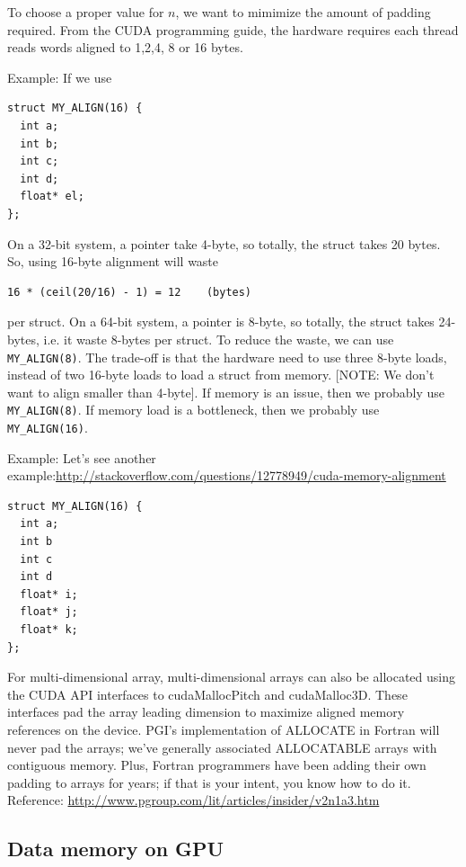 \begin{framed}
To choose a proper value for $n$, we want to mimimize the amount of padding
required. From the CUDA programming guide, the hardware requires each thread
reads words aligned to 1,2,4, 8 or 16 bytes.
\end{framed}

Example: If we use
\begin{lstlisting}
struct MY_ALIGN(16) {
  int a;
  int b;
  int c;
  int d;
  float* el;    
};
\end{lstlisting}
On a 32-bit system, a pointer take 4-byte, so totally, the struct takes 20
bytes. So, using 16-byte alignment will waste 
\begin{verbatim}
16 * (ceil(20/16) - 1) = 12    (bytes)
\end{verbatim}
per struct. On a 64-bit system, a pointer is 8-byte, so totally, the struct
takes 24-bytes, i.e. it waste 8-bytes per struct. To reduce the waste, we can
use \verb!MY_ALIGN(8)!. The trade-off is that the hardware need to use three
8-byte loads, instead of two 16-byte loads to load a struct from memory. [NOTE:
We don't want to align smaller than 4-byte]. If memory is an issue, then we
probably use \verb!MY_ALIGN(8)!. If memory load is a bottleneck, then we
probably use \verb!MY_ALIGN(16)!. 


Example: Let's see another
example:\url{http://stackoverflow.com/questions/12778949/cuda-memory-alignment}
\begin{verbatim}
struct MY_ALIGN(16) {
  int a;
  int b
  int c
  int d
  float* i;
  float* j;
  float* k;
};
\end{verbatim}

For multi-dimensional array, multi-dimensional arrays can also be allocated
using the CUDA API interfaces to cudaMallocPitch and cudaMalloc3D. These
interfaces pad the array leading dimension to maximize aligned memory references
on the device. PGI's implementation of ALLOCATE in Fortran will never pad the
arrays; we've generally associated ALLOCATABLE arrays with contiguous memory.
Plus, Fortran programmers have been adding their own padding to arrays for
years; if that is your intent, you know how to do it. Reference:
\url{http://www.pgroup.com/lit/articles/insider/v2n1a3.htm}


\subsection{Data memory on GPU}
\label{sec:data-memory-gpu}

